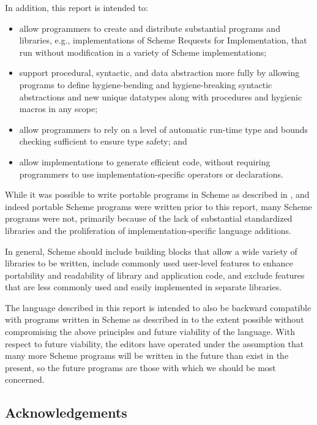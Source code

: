 In addition, this report is intended to:

\begin{itemize}
\item allow programmers to create and distribute substantial programs
  and libraries, e.g., implementations of Scheme Requests for
  Implementation, that run without
  modification in a variety of Scheme implementations;

\item support procedural, syntactic, and data abstraction more fully
  by allowing programs to define hygiene-bending and hygiene-breaking
  syntactic abstractions and new unique datatypes along with
  procedures and hygienic macros in any scope;

\item allow programmers to rely on a level of automatic run-time type
  and bounds checking sufficient to ensure type safety; and

\item allow implementations to generate efficient code, without
  requiring programmers to use implementation-specific operators or
  declarations.
\end{itemize}

While it was possible to write portable programs in Scheme as
described in , and indeed portable Scheme programs were written
prior to this report, many Scheme programs were not, primarily because
of the lack of substantial standardized libraries and the
proliferation of implementation-specific language additions.

In general, Scheme should include building blocks that allow a wide
variety of libraries to be written, include commonly used user-level
features to enhance portability and readability of library and
application code, and exclude features that are less commonly used and
easily implemented in separate libraries.

The language described in this report is intended to also be backward
compatible with programs written in Scheme as described in  to
the extent possible without compromising the above principles and
future viability of the language.  With respect to future viability,
the editors have operated under the assumption that many more Scheme
programs will be written in the future than exist in the present, so
the future programs are those with which we should be most concerned.

\subsection*{Acknowledgements}


